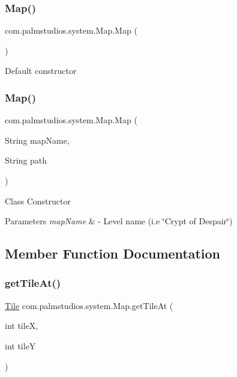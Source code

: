 \subsubsection{\texorpdfstring{Map()}{Map()}\hspace{0.1cm}{\footnotesize\ttfamily [1/2]}}
{\footnotesize\ttfamily com.\+palmstudios.\+system.\+Map.\+Map (\begin{DoxyParamCaption}{ }\end{DoxyParamCaption})}

Default constructor \mbox{\label{classcom_1_1palmstudios_1_1system_1_1_map_a16c4039962cbe6283611c7ec1eecae8c}} 
\subsubsection{\texorpdfstring{Map()}{Map()}\hspace{0.1cm}{\footnotesize\ttfamily [2/2]}}
{\footnotesize\ttfamily com.\+palmstudios.\+system.\+Map.\+Map (\begin{DoxyParamCaption}\item[{String}]{map\+Name,  }\item[{String}]{path }\end{DoxyParamCaption})}

Class Constructor 
\begin{DoxyParams}{Parameters}
{\em map\+Name} & -\/ Level name (i.\+e \char`\"{}\+Crypt of Despair\char`\"{}) \\
\hline
\end{DoxyParams}


\subsection{Member Function Documentation}
\mbox{\label{classcom_1_1palmstudios_1_1system_1_1_map_af424032f2ca95cea0101500487218c72}} 
\subsubsection{\texorpdfstring{get\+Tile\+At()}{getTileAt()}}
{\footnotesize\ttfamily \hyperlink{classcom_1_1palmstudios_1_1system_1_1_tile}{Tile} com.\+palmstudios.\+system.\+Map.\+get\+Tile\+At (\begin{DoxyParamCaption}\item[{int}]{tileX,  }\item[{int}]{tileY }\end{DoxyParamCaption})}


